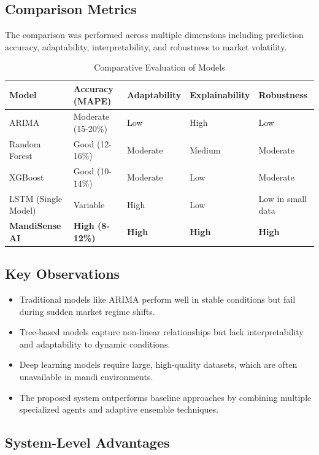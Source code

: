 \documentclass[12pt,a4paper]{report}
\begin{document}
\subsection{Comparison Metrics}

The comparison was performed across multiple dimensions including prediction accuracy, adaptability, interpretability, and robustness to market volatility.

\begin{table}[H]
\centering
\caption{Comparative Evaluation of Models}
\begin{tabular}{|p{3.5cm}|p{2cm}|p{2cm}|p{2cm}|p{2.5cm}|}
\hline
\textbf{Model} & \textbf{Accuracy (MAPE)} & \textbf{Adaptability} & \textbf{Explainability} & \textbf{Robustness} \\
\hline
ARIMA & Moderate (15-20\%) & Low & High & Low \\
\hline
Random Forest & Good (12-16\%) & Moderate & Medium & Moderate \\
\hline
XGBoost & Good (10-14\%) & Moderate & Low & Moderate \\
\hline
LSTM (Single Model) & Variable & High & Low & Low in small data \\
\hline
\textbf{MandiSense AI} & \textbf{High (8-12\%)} & \textbf{High} & \textbf{High} & \textbf{High} \\
\hline
\end{tabular}
\end{table}

\subsection{Key Observations}

\begin{itemize}
    \item Traditional models like ARIMA perform well in stable conditions but fail during sudden market regime shifts.
    \item Tree-based models capture non-linear relationships but lack interpretability and adaptability to dynamic conditions.
    \item Deep learning models require large, high-quality datasets, which are often unavailable in mandi environments.
    \item The proposed system outperforms baseline approaches by combining multiple specialized agents and adaptive ensemble techniques.
\end{itemize}

\subsection{System-Level Advantages}
\end{document}
